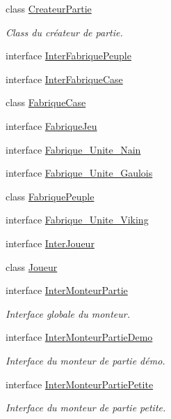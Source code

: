 \begin{DoxyCompactItemize}
class \hyperlink{class_small_world_1_1_createur_partie}{Createur\-Partie}
\begin{DoxyCompactList}\small\item\em Class du créateur de partie. \end{DoxyCompactList}\item 
interface \hyperlink{interface_small_world_1_1_inter_fabrique_peuple}{Inter\-Fabrique\-Peuple}
\item 
interface \hyperlink{interface_small_world_1_1_inter_fabrique_case}{Inter\-Fabrique\-Case}
\item 
class \hyperlink{class_small_world_1_1_fabrique_case}{Fabrique\-Case}
\item 
interface \hyperlink{interface_small_world_1_1_fabrique_jeu}{Fabrique\-Jeu}
\item 
interface \hyperlink{interface_small_world_1_1_fabrique___unite___nain}{Fabrique\-\_\-\-Unite\-\_\-\-Nain}
\item 
interface \hyperlink{interface_small_world_1_1_fabrique___unite___gaulois}{Fabrique\-\_\-\-Unite\-\_\-\-Gaulois}
\item 
class \hyperlink{class_small_world_1_1_fabrique_peuple}{Fabrique\-Peuple}
\item 
interface \hyperlink{interface_small_world_1_1_fabrique___unite___viking}{Fabrique\-\_\-\-Unite\-\_\-\-Viking}
\item 
interface \hyperlink{interface_small_world_1_1_inter_joueur}{Inter\-Joueur}
\item 
class \hyperlink{class_small_world_1_1_joueur}{Joueur}
\item 
interface \hyperlink{interface_small_world_1_1_inter_monteur_partie}{Inter\-Monteur\-Partie}
\begin{DoxyCompactList}\small\item\em Interface globale du monteur. \end{DoxyCompactList}\item 
interface \hyperlink{interface_small_world_1_1_inter_monteur_partie_demo}{Inter\-Monteur\-Partie\-Demo}
\begin{DoxyCompactList}\small\item\em Interface du monteur de partie démo. \end{DoxyCompactList}\item 
interface \hyperlink{interface_small_world_1_1_inter_monteur_partie_petite}{Inter\-Monteur\-Partie\-Petite}
\begin{DoxyCompactList}\small\item\em Interface du monteur de partie petite. \end{DoxyCompactList}\item 

\end{DoxyCompactItemize}

